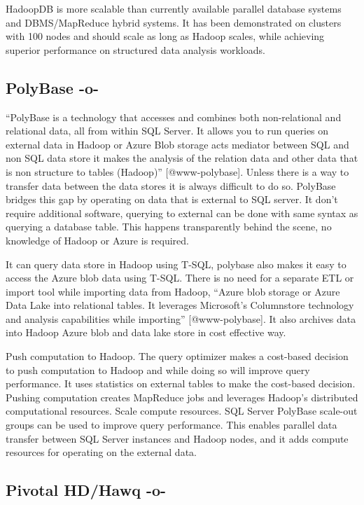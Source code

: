  HadoopDB is more scalable than currently available parallel database
 systems and DBMS/MapReduce hybrid systems. It has been demonstrated
 on clusters with 100 nodes and should scale as long as Hadoop scales,
 while achieving superior performance on structured data analysis
 workloads.
     
\subsection{PolyBase -o-}

``PolyBase is a technology that accesses and combines both
non-relational and relational data, all from within SQL Server. It
allows you to run queries on external data in Hadoop or Azure Blob
storage acts mediator between SQL and non SQL data store it makes the
analysis of the relation data and other data that is non structure to
tables (Hadoop)'' [@www-polybase]. Unless there is a way to
transfer data between the data stores it is always difficult to do so.
PolyBase bridges this gap by operating on data that is external to SQL
server. It don't require additional software, querying to external can
be done with same syntax as querying a database table.  This happens
transparently behind the scene, no knowledge of Hadoop or Azure is
required.

It can query data store in Hadoop using T-SQL, polybase also makes it
easy to access the Azure blob data using T-SQL. There is no need for a
separate ETL or import tool while importing data from Hadoop, ``Azure
blob storage or Azure Data Lake into relational tables. It leverages
Microsoft's Columnstore technology and analysis capabilities while
importing'' [@www-polybase]. It also archives data into Hadoop
Azure blob and data lake store in cost effective way.

Push computation to Hadoop. The query optimizer makes a cost-based
decision to push computation to Hadoop and while doing so will improve
query performance. It uses statistics on external tables to make the
cost-based decision. Pushing computation creates MapReduce jobs and
leverages Hadoop's distributed computational resources. Scale compute
resources. SQL Server PolyBase scale-out groups can be used to improve
query performance. This enables parallel data transfer between SQL
Server instances and Hadoop nodes, and it adds compute resources for
operating on the external data.




\subsection{Pivotal HD/Hawq -o-}

